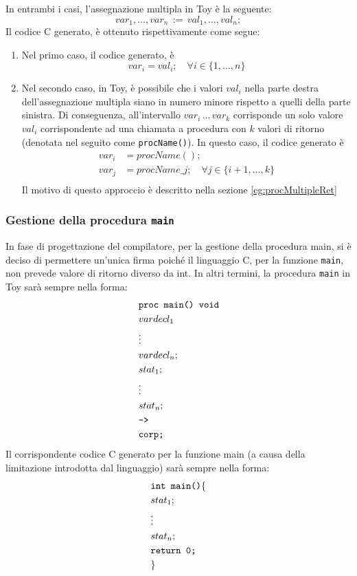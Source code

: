 \documentclass[a4paper,12pt]{article}
\begin{document}
		In entrambi i casi, l'assegnazione multipla in Toy è la seguente: 
		\[var_1, \dots, var_n\, := \, val_1, \dots, val_n;\] 			
		Il codice C generato, è ottenuto rispettivamente come segue:
		\begin{enumerate}
			\item Nel primo caso, il codice generato, è 
			 	  \[var_i = val_i; \quad \forall i \in \{1, \dots, n\}\]
					
			\item	Nel secondo caso, in Toy, è possibile che i valori $val_i$ nella parte destra dell'assegnazione multipla siano in numero
					minore rispetto a quelli della parte sinistra. Di conseguenza, all'intervallo $var_i \, \dots \, var_k$ corrisponde 
					un solo valore $val_i$ corrispondente ad una chiamata a procedura con $k$ valori di ritorno 
					(denotata nel seguito come \texttt{procName()}).
					In questo caso, il codice generato è 
					\begin{align*}
						var_i & = procName(); \\
						var_j & = procName\_j; \quad \forall j \in \{i+1, \dots, k\} \\
					\end{align*}
					Il motivo di questo approccio è descritto nella sezione \ref{cg:procMultipleRet}
		\end{enumerate}
	
	\subsubsection{Gestione della procedura \texttt{main}}
	In fase di progettazione del compilatore, per la gestione della procedura main, si è deciso di permettere un'unica firma 
	poiché il linguaggio C, per la funzione \texttt{main}, non prevede valore di ritorno diverso da int.
	In altri termini, la procedura \texttt{main} in Toy sarà sempre nella forma: 
	\begin{align*}
		& \text{\texttt{proc main() void}} \\
		& vardecl_1 \\
		& \vdots \\
		& vardecl_n; \\
		& stat_1; \\
		& \vdots  \\
		& stat_n; \\
		& \text{\texttt{->}} \\
		& \text{\texttt{corp;}}
	\end{align*}
	Il corrispondente codice C generato per la funzione main (a causa della limitazione introdotta dal linguaggio) sarà sempre nella forma:
	\begin{align*}
		& \text{\texttt{int main()}}\{ \\
		& stat_1; \\
		& \vdots  \\
		& stat_n; \\
		& \text{\texttt{return 0;}} \\
		& \}
	\end{align*}
		
\end{document}
